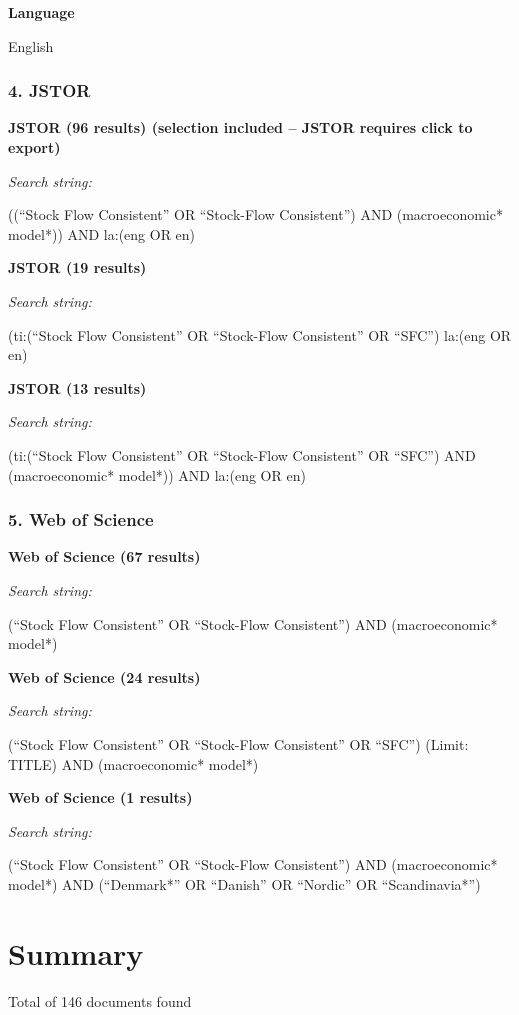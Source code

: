 \documentclass[
]{book}
\begin{document}
\textbf{Language}

English

\hypertarget{jstor}{%
\subsubsection{4. JSTOR}\label{jstor}}

\textbf{JSTOR (96 results) (selection included -- JSTOR requires click to export)}

\emph{Search string:}

((``Stock Flow Consistent'' OR ``Stock-Flow Consistent'') AND (macroeconomic* model*)) AND la:(eng OR en)

\textbf{JSTOR (19 results)}

\emph{Search string:}

(ti:(``Stock Flow Consistent'' OR ``Stock-Flow Consistent'' OR ``SFC'') la:(eng OR en)

\textbf{JSTOR (13 results)}

\emph{Search string:}

(ti:(``Stock Flow Consistent'' OR ``Stock-Flow Consistent'' OR ``SFC'') AND (macroeconomic* model*)) AND la:(eng OR en)

\hypertarget{web-of-science}{%
\subsubsection{5. Web of Science}\label{web-of-science}}

\textbf{Web of Science (67 results)}

\emph{Search string:}

(``Stock Flow Consistent'' OR ``Stock-Flow Consistent'')
AND
(macroeconomic* model*)

\textbf{Web of Science (24 results)}

\emph{Search string:}

(``Stock Flow Consistent'' OR ``Stock-Flow Consistent'' OR ``SFC'') (Limit: TITLE)
AND
(macroeconomic* model*)

\textbf{Web of Science (1 results)}

\emph{Search string:}

(``Stock Flow Consistent'' OR ``Stock-Flow Consistent'')
AND
(macroeconomic* model*)
AND
(``Denmark*'' OR ``Danish'' OR ``Nordic'' OR ``Scandinavia*'')

\hypertarget{summary}{%
\section{Summary}\label{summary}}

Total of 146 documents found

  
\end{document}
